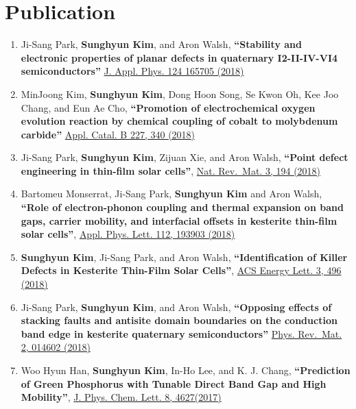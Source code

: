 \hypertarget{publication}{%
\section{Publication}\label{publication}}

\begin{enumerate}
\def\labelenumi{\arabic{enumi}.}
\item
  Ji-Sang Park, \textbf{Sunghyun Kim}, and Aron Walsh,
  \textbf{``Stability and electronic properties of planar defects in
  quaternary I2-II-IV-VI4 semiconductors''}
  \href{https://doi.org/10.1063/1.5053424}{J. Appl. Phys. 124 165705
  (2018)}
\item
  MinJoong Kim, \textbf{Sunghyun Kim}, Dong Hoon Song, Se Kwon Oh, Kee
  Joo Chang, and Eun Ae Cho, \textbf{``Promotion of electrochemical
  oxygen evolution reaction by chemical coupling of cobalt to molybdenum
  carbide''} \href{https://doi.org/10.1016/j.apcatb.2018.01.051}{Appl.
  Catal. B 227, 340 (2018)}
\item
  Ji-Sang Park, \textbf{Sunghyun Kim}, Zijuan Xie, and Aron Walsh,
  \textbf{``Point defect engineering in thin-film solar cells''},
  \href{https://doi.org/10.1038/s41578-018-0026-7}{Nat. Rev.~Mat. 3, 194
  (2018)}
\item
  Bartomeu Monserrat, Ji-Sang Park, \textbf{Sunghyun Kim} and Aron
  Walsh, \textbf{``Role of electron-phonon coupling and thermal
  expansion on band gaps, carrier mobility, and interfacial offsets in
  kesterite thin-film solar cells''},
  \href{https://doi.org/10.1063/1.5028186}{Appl. Phys. Lett. 112, 193903
  (2018)}
\item
  \textbf{Sunghyun Kim}, Ji-Sang Park, and Aron Walsh,
  \textbf{``Identification of Killer Defects in Kesterite Thin-Film
  Solar Cells''},
  \href{https://pubs.acs.org/doi/abs/10.1021/acsenergylett.7b01313}{ACS
  Energy Lett. 3, 496 (2018)}
\item
  Ji-Sang Park, \textbf{Sunghyun Kim}, and Aron Walsh,
  \textbf{``Opposing effects of stacking faults and antisite domain
  boundaries on the conduction band edge in kesterite quaternary
  semiconductors''}
  \href{https://journals.aps.org/prmaterials/abstract/10.1103/PhysRevMaterials.2.014602}{Phys.
  Rev.~Mat. 2, 014602 (2018)}
\item
  Woo Hyun Han, \textbf{Sunghyun Kim}, In-Ho Lee, and K. J. Chang,
  \textbf{``Prediction of Green Phosphorus with Tunable Direct Band Gap
  and High Mobility''},
  \href{https://pubs.acs.org/doi/10.1021/acs.jpclett.7b02153}{J. Phys.
  Chem. Lett. 8, 4627(2017)}

\end{enumerate}
